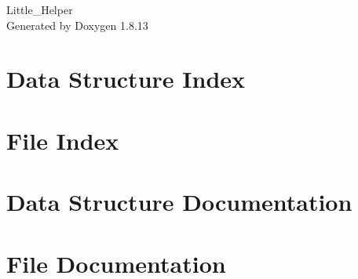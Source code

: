 \documentclass[twoside]{book}
\newcommand{\+}{\discretionary{\mbox{\scriptsize$\hookleftarrow$}}{}{}}
\newcommand{\clearemptydoublepage}{%
  \newpage{\pagestyle{empty}\cleardoublepage}%
}
\begin{document}
\hypersetup{pageanchor=false,
             bookmarksnumbered=true,
             pdfencoding=unicode
            }
\begin{titlepage}
\vspace*{7cm}
\begin{center}%
{\Large Little\+\_\+\+Helper }\\
\vspace*{1cm}
{\large Generated by Doxygen 1.8.13}\\
\end{center}
\end{titlepage}
\clearemptydoublepage
{}
\tableofcontents
\clearemptydoublepage
{}
\hypersetup{pageanchor=true}

\chapter{Data Structure Index}

\chapter{File Index}

\chapter{Data Structure Documentation}












\chapter{File Documentation}


















































\backmatter
\newpage
{}
\clearemptydoublepage
{}
\printindex
\end{document}

